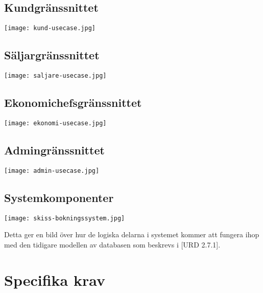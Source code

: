\documentclass[a4paper, twoside, 11pt, titlepage]{article}
\begin{document}
	\subsection{Kundgränssnittet}


	\texttt{[image: kund-usecase.jpg]}

	\subsection{Säljargränssnittet}


	\texttt{[image: saljare-usecase.jpg]}

	\subsection{Ekonomichefsgränssnittet}


	\texttt{[image: ekonomi-usecase.jpg]}

	\subsection{Admingränssnittet}


	\texttt{[image: admin-usecase.jpg]}

	\subsection{Systemkomponenter}


	\texttt{[image: skiss-bokningssystem.jpg]}

	Detta ger en bild över hur de logiska delarna i systemet kommer att fungera ihop med den tidigare modellen av databasen som beskrevs i [URD 2.7.1].

\clearpage
\section{Specifika krav}
\end{document}
